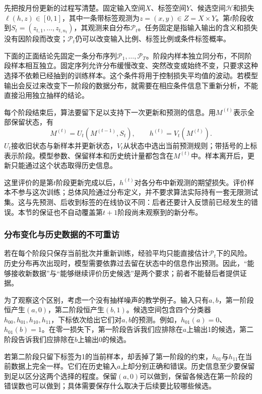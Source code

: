 先把按月份更新的过程写清楚。固定输入空间$X$、标签空间$Y$、候选空间$\mathcal H$和损失$\ell(h,z)\in[0,1]$，其中一条带标签观测为$z=(x,y)\in Z=X\times Y$。第$t$阶段收到$S_t=(z_{t,1},\ldots,z_{t,n_t})$，其观测来自分布$\mathcal P_t$。任务固定是指输入输出的含义和损失没有因阶段而改变；$\mathcal P_t$仍可以改变输入比例、标签比例或条件标签概率。

下面的正面结论先固定一条分布序列$\mathcal P_1,\ldots,\mathcal P_T$。阶段内样本独立同分布，不同阶段样本相互独立。固定序列允许分布缓慢改变、突然改变或始终不变，只要求这种选择不依赖已经抽到的训练样本。这个条件将用于控制损失平均值的波动。若模型输出会反过来改变下一阶段的数据分布，就需要在相应条件信息下重新分析，不能直接沿用独立抽样的结论。

每个阶段结束后，算法要留下足以支持下一次更新和预测的信息。用$M^{(t)}$表示全部保留状态，有
\[
 M^{(t)}=U_t(M^{(t-1)},S_t),\qquad
 h^{(t)}=V_t(M^{(t)}).
\]
$U_t$接收旧状态与新样本并更新状态，$V_t$从状态中选出当前预测规则；带括号的上标表示阶段。模型参数、保留样本和历史统计量都包含在$M^{(t)}$中。样本离开后，更新只能通过这个状态取得历史信息。

这里评价的是第$t$阶段更新完成以后，$h^{(t)}$对各分布中新观测的期望损失。评价样本不参与这次训练；总体风险通过分布定义，并不要求算法实际持有一套无限测试集。这与先预测、后收到标签的在线协议不同：后者还要计入反馈前已经发生的错误。本节的保证也不自动覆盖第$t+1$阶段尚未观察到的新分布。

\subsubsection{分布变化与历史数据的不可重访}

若在每个阶段只保存当前批次并重新训练，经验平均只能直接估计$\mathcal P_t$下的风险。历史分布再次出现时，模型需要依靠过去留在状态中的信息作出预测。因此，“能够接收新数据”与“能够继续评价历史候选”是两个要求；前者不能替后者提供证据。

为了观察这个区别，考虑一个没有抽样噪声的教学例子。输入只有$a,b$，第一阶段恒产生$(a,0)$，第二阶段恒产生$(b,1)$。候选空间包含四个分类器$h_{00},h_{01},h_{10},h_{11}$，下标依次给出它们对$a,b$的预测。例如，$h_{01}(a)=0$、$h_{01}(b)=1$。在零一损失下，第一阶段告诉我们应排除在$a$上输出1的候选，第二阶段告诉我们应排除在$b$上输出0的候选。

若第二阶段只留下标签为1的当前样本，却丢掉了第一阶段的约束，$h_{01}$与$h_{11}$在当前数据上完全一样。它们在历史输入$a$上却分别正确和错误。历史信息至少要保留到足以区分这两个选择的程度。保留$(a,0)$可以做到，保留各候选在第一阶段的错误数也可以做到；具体需要保存什么取决于后续要比较哪些候选。


